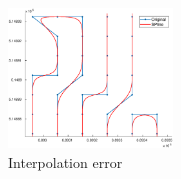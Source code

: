 \begin{figure}[H]
    \centering
    \includegraphics[width=0.39\textwidth]{figures/C3/Interpolation-error.eps}
    \caption{Interpolation error}
    \label{fig:interpolation-error}
\end{figure}








